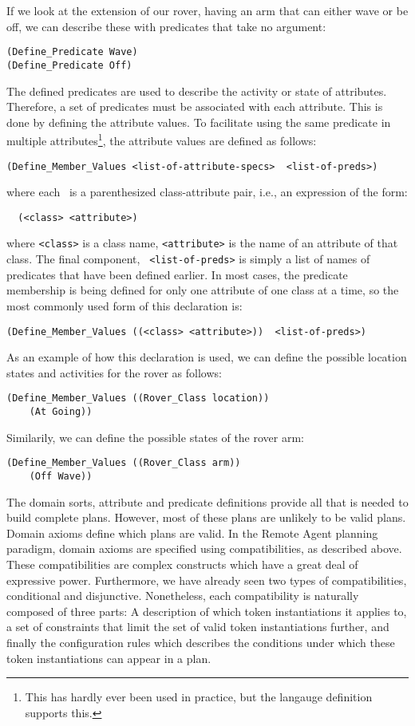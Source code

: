 If we look at the extension of our rover, having an arm that can
either wave or be off, we can describe these with predicates that take
no argument:
  \begin{verbatim}
(Define_Predicate Wave)
(Define_Predicate Off) \end{verbatim}

The defined predicates are used to describe the activity or state of
attributes.  Therefore, a set of predicates must be associated with
each attribute.  This is done by defining the attribute values.  To 
facilitate using the same predicate in multiple 
attributes\footnote{This has hardly ever been used in practice, but 
the langauge definition supports this.}, the attribute values are 
defined as follows:
  \begin{verbatim}
(Define_Member_Values <list-of-attribute-specs>  <list-of-preds>)
\end{verbatim}
  where each {\tt <attribute-spec>}\ is a parenthesized
class-attribute pair, i.e., an expression of the form:
\begin{verbatim}
  (<class> <attribute>) \end{verbatim}
  where {\tt <class>} is a class name, {\tt <attribute>} is the name
of an attribute of that class.  The final component, {\tt
<list-of-preds>} is simply a list of names of predicates that have
been defined earlier.  In most cases, the predicate membership is
being defined for only one attribute of one class at a time, so the
most commonly used form of this declaration is:
  \begin{verbatim}
(Define_Member_Values ((<class> <attribute>))  <list-of-preds>)
\end{verbatim}

As an example of how this declaration is used, we can define the
possible location states and activities for the rover as follows:
  \begin{verbatim}
(Define_Member_Values ((Rover_Class location)) 
    (At Going))  \end{verbatim}
  Similarily, we can define the possible states of the rover arm:
  \begin{verbatim}
(Define_Member_Values ((Rover_Class arm))
    (Off Wave)) \end{verbatim}




The domain sorts, attribute and predicate definitions provide all that
is needed to build complete plans.  However, most of these plans are
unlikely to be valid plans.  Domain axioms define which plans are
valid.  In the Remote Agent planning paradigm, domain axioms are
specified using compatibilities, as described above.  These
compatibilities are complex constructs which have a great deal of
expressive power.  Furthermore, we have already seen two types of
compatibilities, conditional and disjunctive.  Nonetheless, each
compatibility is naturally composed of three parts: A description of
which token instantiations it applies to, a set of constraints that
limit the set of valid token instantiations further, and finally the
configuration rules which describes the conditions under which these
token instantiations can appear in a plan.

